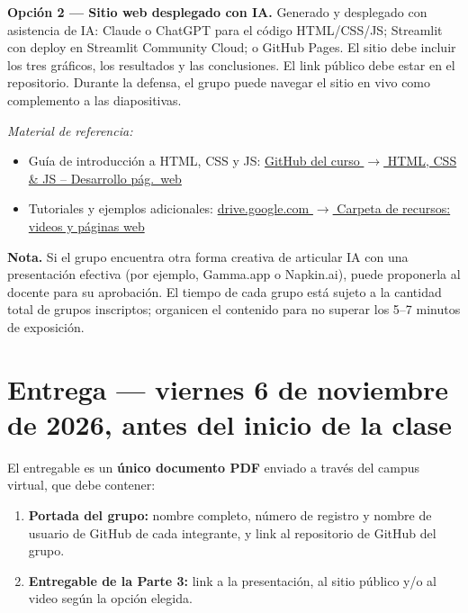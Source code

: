 \documentclass[11pt,a4paper]{article}
\newcommand{\FechaEntrega}{viernes 6 de noviembre de 2026, antes del inicio de la clase}
\begin{document}
\begin{caja}
\textbf{Opción 2 --- Sitio web desplegado con IA.} Generado y desplegado con asistencia de
IA: Claude o ChatGPT para el código HTML/CSS/JS; Streamlit con deploy en Streamlit
Community Cloud; o GitHub Pages. El sitio debe incluir los tres gráficos, los resultados y
las conclusiones. El link público debe estar en el repositorio. Durante la defensa, el grupo
puede navegar el sitio en vivo como complemento a las diapositivas.

\smallskip
\emph{Material de referencia:}
\begin{itemize}[itemsep=1pt]
  \item Guía de introducción a HTML, CSS y JS:
        \href{https://github.com/Datso653/Laboratorio-de-metodos-Cuantitativos-Aplicados-a-la-gestion/blob/main/PPT's/Complemento\%20TP/HTML\%2CCSS\%20\%26\%20JS\%20-\%20Desarrollo\%20pag\%20web.pdf}{GitHub del curso $\rightarrow$ HTML, CSS \& JS -- Desarrollo pág.\ web}
  \item Tutoriales y ejemplos adicionales:
        \href{https://drive.google.com/drive/folders/1x0gSDeycByC-HAt3AUxWFzJ3Co_mkMpl?usp=drive_link}{drive.google.com $\rightarrow$ Carpeta de recursos: videos y páginas web}
\end{itemize}
\end{caja}

\begin{nota}
\textbf{Nota.} Si el grupo encuentra otra forma creativa de articular IA con una presentación efectiva
(por ejemplo, Gamma.app o Napkin.ai), puede proponerla al docente para su aprobación.
El tiempo de cada grupo está sujeto a la cantidad total de grupos inscriptos; organicen el
contenido para no superar los 5--7 minutos de exposición.
\end{nota}

\section*{Entrega --- \FechaEntrega}
El entregable es un \textbf{único documento PDF} enviado a través del campus virtual, que debe
contener:
\begin{enumerate}[itemsep=2pt]
  \item \textbf{Portada del grupo:} nombre completo, número de registro y nombre de usuario de
        GitHub de cada integrante, y link al repositorio de GitHub del grupo.
  \item \textbf{Entregable de la Parte 3:} link a la presentación, al sitio público y/o al video según la
        opción elegida.
\end{enumerate}
\end{document}
